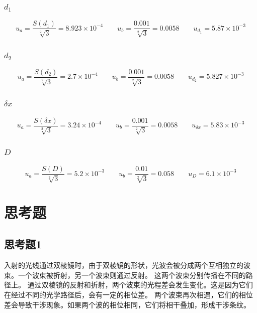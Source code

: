 \documentclass{ctexart}
\begin{document}
    \subsubsection{$d_{1}$}
    \begin{equation}
      u_{a} = \frac{S(d_{1})}{\sqrt[2]{3}}=8.923\times 10^{-4}\qquad
      u_{b} = \frac{0.001}{\sqrt[2]{3}}=0.0058\qquad
      u_{d_{1}} = 5.87\times 10^{-3}
    \end{equation}

    \subsubsection{$d_{2}$}
    \begin{equation}
      u_{a} = \frac{S(d_{2})}{\sqrt[2]{3}}=2.7\times 10^{-4}\qquad
      u_{b} = \frac{0.001}{\sqrt[2]{3}}=0.0058\qquad
      u_{d_{2}} = 5.827\times 10^{-3}
    \end{equation}

    \subsubsection{$\delta x$}
    \begin{equation}
      u_{a} = \frac{S(\delta x)}{\sqrt[2]{3}}=3.24\times 10^{-4}\qquad
      u_{b} = \frac{0.001}{\sqrt[2]{3}}=0.0058\qquad
      u_{\delta x} = 5.83\times 10^{-3}
    \end{equation}

    \subsubsection{$D$}
    \begin{equation}
      u_{a} = \frac{S(D)}{\sqrt[2]{3}}=5.2\times 10^{-3}\qquad
      u_{b} = \frac{0.01}{\sqrt[2]{3}}=0.058\qquad
      u_{D} = 6.1\times 10^{-3}
    \end{equation}
\section{思考题}
  \subsection{思考题1}
  入射的光线通过双棱镜时，由于双棱镜的形状，光波会被分成两个互相独立的波束。一个波束被折射，另一个波束则通过反射。
  这两个波束分别传播在不同的路径上。
  通过双棱镜的反射和折射，两个波束的光程差会发生变化。这是因为它们在经过不同的光学路径后，会有一定的相位差。
  两个波束再次相遇，它们的相位差会导致干涉现象。如果两个波的相位相同，它们将相干叠加，形成干涉条纹。
\end{document}
